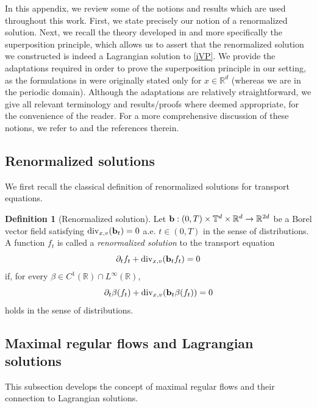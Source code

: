 \documentclass[11pt,reqno,a4paper]{amsart}
\newcommand{\R}{\mathbb{R}}
\theoremstyle{definition}
\newtheorem{definition}[lemma]{Definition}
\theoremstyle{remark}
\numberwithin{equation}{section}
\newcommand{\T} {\mathbb T}
\newcommand{\pa}{\partial}
\newcommand{\bfb}{{\bf b}}
\begin{document}
In this appendix, we review some of the notions and results which are used throughout this work. First, we state precisely our notion of a renormalized solution. Next, we recall the theory developed in \cite{ambrosiocolombofigalli2015, ambrosiocolombofigalli2017, ambrosiocrippa2008} and more specifically the superposition principle, which allows us to assert that the renormalized solution we constructed is indeed a Lagrangian solution to \eqref{iVP}. We provide the adaptations required in order to prove the superposition principle in our setting, as the formulations in \cite{ambrosiocolombofigalli2017} were originally stated only for $x\in \R^d$ (whereas we are in the periodic domain). Although the adaptations are relatively straightforward, we give all relevant terminology and results/proofs where deemed appropriate, for the convenience of the reader. For a more comprehensive discussion of these notions, we refer to \cite{ambrosiocolombofigalli2017, dipernalions1988b} and the references therein.



%
%
%
%
%

\subsection{Renormalized solutions}
We first recall the classical definition of renormalized solutions for transport equations.

\begin{definition} [Renormalized solution]\label{def: renormalized}
Let $\bfb :(0,T)\times \T^d \times \R^d \to \R^{2d}$ be a Borel vector field satisfying $\text{div}_{x,v}(\bfb_t) = 0$ a.e. $t\in(0,T)$ in the sense of distributions. A function $f_t$ is called a {\it renormalized solution} to the transport equation
\[
\pa_t f_t + \text{div}_{x,v}(\bfb_t f_t) = 0
\]
if, for every $\beta \in C^1(\R)\cap L^\infty(\R)$,
\[
\pa_t \beta(f_t) + \text{div}_{x,v}(\bfb_t \beta(f_t)) = 0
\]
holds in the sense of distributions. 
\end{definition}




%
%
%
%
%
\subsection{Maximal regular flows and Lagrangian solutions}
This subsection develops the concept of maximal regular flows and their connection to Lagrangian solutions.
\end{document}
